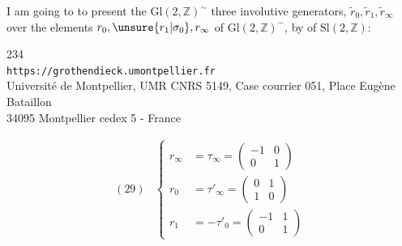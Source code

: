 I am going to  to present the  
$\mathrm{Gl}(2,\mathbb Z)^{\sim}$  three involutive generators,
 $\widetilde r_0,\widetilde r_1,\widetilde r_\infty$ over the elements
$r_0,\unsure{r_1|\sigma_0},r_\infty$ of $\mathrm{Gl}(2,\mathbb Z)^{-}$, by   of $\mathrm{Sl}(2,\mathbb Z)$:


\begin{center}
234\\
\texttt{https://grothendieck.umontpellier.fr}\\
Université de Montpellier, UMR CNRS 5149, Case courrier 051, Place Eugène Bataillon\\
34095 Montpellier cedex 5 - France
\end{center}


\[
\begin{array}{ll}
(29)&\left\{
\begin{aligned}
r_\infty&=\tau_\infty=\begin{pmatrix}-1&0\\0&1\end{pmatrix}\\
r_0&=\tau'_\infty=\begin{pmatrix}0&1\\1&0\end{pmatrix}\\
r_1&=-\tau'_0=\begin{pmatrix}-1&1\\0&1\end{pmatrix}
\end{aligned}
\right.
\end{array}
\]
\margin{$\left[\begin{array}{ll}
(30)&\left\{
\begin{aligned}
r_0(\rho)&=\rho^{-1},\quad r_0(\sigma)=\sigma^{-1}\\
r_1&=\rho^{-1}r_0=r_0\rho\\
r_\infty&=\sigma r_0=r_0\sigma^{-1}
\end{aligned}\right.
\end{array}\right.$}

